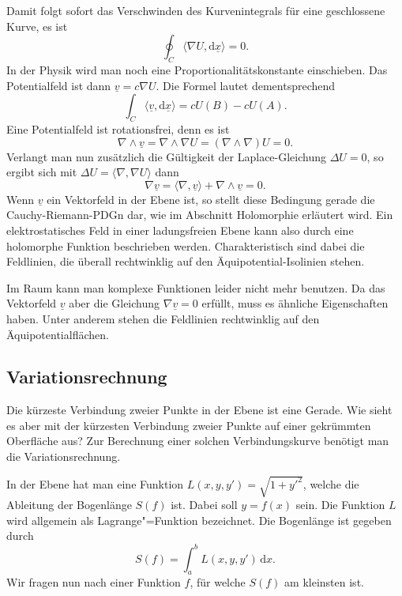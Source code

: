\documentclass[a4paper,10pt,fleqn,twocolumn,twoside]{article}
\numberwithin{equation}{section}
\begin{document}
Damit folgt sofort das Verschwinden des Kurvenintegrals für eine
geschlossene Kurve, es ist
\begin{equation}
\oint_C \langle\nabla U,\mathrm d\underline x\rangle = 0.
\end{equation}
In der Physik wird man noch eine Proportionalitätskonstante einschieben.
Das Potentialfeld ist dann $\underline v=c\nabla U$.
Die Formel lautet dementsprechend
\begin{equation}
\int_C \langle\underline v,\mathrm d\underline x\rangle
= cU(B)-cU(A).
\end{equation}
Eine Potentialfeld ist rotationsfrei, denn es ist
\begin{equation}
\nabla\wedge\underline v = \nabla\wedge \nabla U
= (\nabla\wedge\nabla)U = 0.
\end{equation}
Verlangt man nun zusätzlich die Gültigkeit der Laplace-Gleichung
$\Delta U = 0$, so ergibt sich mit
$\Delta U = \langle\nabla,\nabla U\rangle$ dann
\begin{equation}
\nabla\underline v
= \langle\nabla,\underline v\rangle + \nabla\wedge\underline v=0.
\end{equation}
Wenn $\underline v$ ein Vektorfeld in der Ebene ist, so
stellt diese Bedingung gerade die Cauchy-Riemann-PDGn dar, wie
im Abschnitt Holomorphie erläutert wird. Ein elektrostatisches
Feld in einer ladungsfreien Ebene kann also durch eine holomorphe
Funktion beschrieben werden. Charakteristisch sind dabei die
Feldlinien, die überall rechtwinklig auf den Äquipotential-Isolinien
stehen.

Im Raum kann man komplexe Funktionen leider nicht mehr benutzen.
Da das Vektorfeld $\underline v$ aber die Gleichung
$\nabla\underline v=0$ erfüllt, muss es ähnliche Eigenschaften
haben. Unter anderem stehen die Feldlinien rechtwinklig auf den
Äquipotentialflächen.


\subsection{Variationsrechnung}

Die kürzeste Verbindung zweier Punkte in der Ebene ist eine Gerade.
Wie sieht es aber mit der kürzesten Verbindung zweier Punkte auf
einer gekrümmten Oberfläche aus? Zur Berechnung einer solchen
Verbindungskurve benötigt man die Variationsrechnung.

In der Ebene hat man eine Funktion $L(x,y,y') = \sqrt{1+y'^2}$,
welche die Ableitung der Bogenlänge $S(f)$ ist. Dabei soll
$y=f(x)$ sein. Die Funktion $L$ wird allgemein als
Lagrange"=Funktion bezeichnet. Die Bogenlänge ist gegeben durch
\begin{equation}
S(f) = \int_a^b L(x,y,y')\,\mathrm dx.
\end{equation}
Wir fragen nun nach einer Funktion $f$, für welche $S(f)$ am
kleinsten ist.
\end{document}
